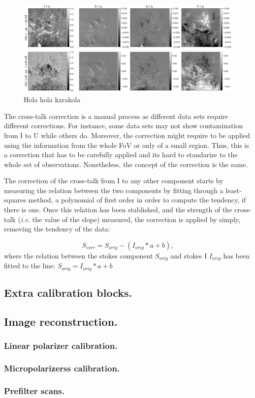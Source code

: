 \begin{figure}[t]
  \includegraphics[width=\textwidth]{figures/Pipeline/Example_demodulation.pdf}
  \caption{
    Hola hola karakola }
    \label{fig_pipeline: demodulated_data}
\end{figure}

The cross-talk correction is a manual process as different data sets require different corrections. For instance, some data sets may not show contamination from I to U while others do. Moreover, the correction might require to be applied using the information from the whole FoV or only of a small region. Thus, this is a correction that has to be carefully applied and its hard to standarize to the whole set of observations. Nonetheless, the concept of the correction is the same. 

The correction of the cross-talk from I to any other component starts by measuring the relation between the two components by fitting through a least-squares method, a polynomial of first order in order to compute the tendency, if there is one. Once this relation has been stablished, and the strength of the cross-talk (\textit{i.e.} the value of the slope) measured, the correction is applied by simply, removing the tendency of the data: 

\begin{equation}
  S_{corr} = S_{orig} - (I_{orig} * a + b),
\end{equation}
where the relation between the stokes component $S_{orig}$ and stokes I $I_{orig}$ has been fitted to the line: $S_{orig} =  I_{orig} * a + b$

\subsection{Extra calibration blocks.}

\subsection{Image reconstruction.}
\subsubsection{Linear polarizer calibration.}
\subsubsection{Micropolarizerss calibration.}
\subsubsection{Prefilter scans.}

